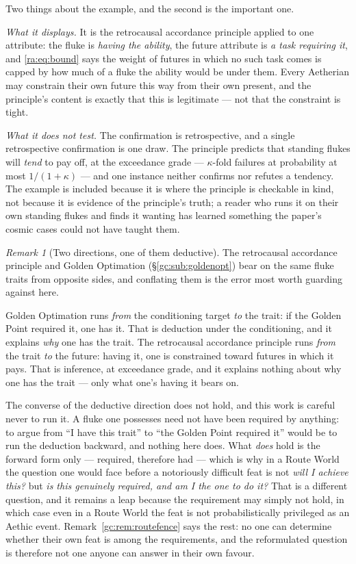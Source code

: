 \documentclass[11pt]{article}
\numberwithin{equation}{section}
\theoremstyle{plain}
\theoremstyle{definition}
\theoremstyle{remark}
\newtheorem{remark}[theorem]{Remark}
\begin{document}
Two things about the example, and the second is the important one.

\emph{What it displays.} It is the retrocausal accordance principle
applied to one attribute: the fluke is \emph{having the ability}, the
future attribute is \emph{a task requiring it}, and
\eqref{ra:eq:bound} says the weight of futures in which no such task
comes is capped by how much of a fluke the ability would be under them.
Every Aetherian may constrain their own future this way from their own
present, and the principle's content is exactly that this is legitimate
--- not that the constraint is tight.

\emph{What it does not test.} The confirmation is retrospective, and a
single retrospective confirmation is one draw. The principle predicts
that standing flukes will \emph{tend} to pay off, at the exceedance
grade --- $\kappa$-fold failures at probability at most $1/(1+\kappa)$
--- and one instance neither confirms nor refutes a tendency. The
example is included because it is where the principle is checkable in
kind, not because it is evidence of the principle's truth; a reader who
runs it on their own standing flukes and finds it wanting has learned
something the paper's cosmic cases could not have taught them.

\begin{remark}[Two directions, one of them deductive]\label{ra:rem:twodirs}
The retrocausal accordance principle and Golden Optimation
(\S\ref{gc:sub:goldenopt}) bear on the same fluke traits from opposite
sides, and conflating them is the error most worth guarding against here.

Golden Optimation runs \emph{from} the conditioning target \emph{to} the
trait: if the Golden Point required it, one has it. That is deduction
under the conditioning, and it explains \emph{why} one has the trait.
The retrocausal accordance principle runs \emph{from} the trait \emph{to}
the future: having it, one is constrained toward futures in which it
pays. That is inference, at exceedance grade, and it explains nothing
about why one has the trait --- only what one's having it bears on.

The converse of the deductive direction does not hold, and this work is
careful never to run it. A fluke one possesses need not have been
required by anything: to argue from ``I have this trait'' to ``the Golden
Point required it'' would be to run the deduction backward, and nothing
here does. What \emph{does} hold is the forward form only --- required,
therefore had --- which is why in a Route World the question one would
face before a notoriously difficult feat is not \emph{will I achieve
this?} but \emph{is this genuinely required, and am I the one to do it?}
That is a different question, and it remains a leap because the
requirement may simply not hold, in which case even in a Route World the
feat is not probabilistically privileged as an Aethic event.
Remark~\ref{gc:rem:routefence} says the rest: no one can determine
whether their own feat is among the requirements, and the reformulated
question is therefore not one anyone can answer in their own favour.
\end{remark}
\end{document}
